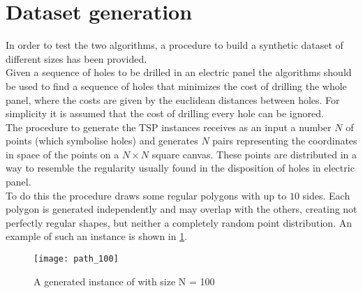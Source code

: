 
\section{Dataset generation}
\label{sec:datasetgen}
In order to test the two algorithms, a procedure to build a synthetic dataset of different sizes has been provided.\\ 
Given a sequence of holes to be drilled in an electric panel the algorithms should be used to find a sequence of holes that minimizes the cost of drilling the whole panel, where the costs are given by the euclidean distances between holes. For simplicity it is assumed that the cost of drilling every hole can be ignored.\\
The procedure to generate the TSP instances receives as an input a number $N$ of points (which symbolise holes) and generates $N$ pairs representing the coordinates in space of the points on a $N\times N$ square canvas. These points are distributed in a way to resemble the regularity usually found in the disposition of holes in electric panel.\\ 
To do this the procedure draws some regular polygons with up to $10$ sides. Each polygon is generated independently and may overlap with the others, creating not perfectly regular shapes, but neither a completely random point distribution. An example of such an instance is shown in \cref{fig:dataexample}.

\begin{figure}[]
	\centering
	\texttt{[image: path\_100]}
	\caption{A generated instance of with size N = 100}
	\label{fig:dataexample}
\end{figure}

